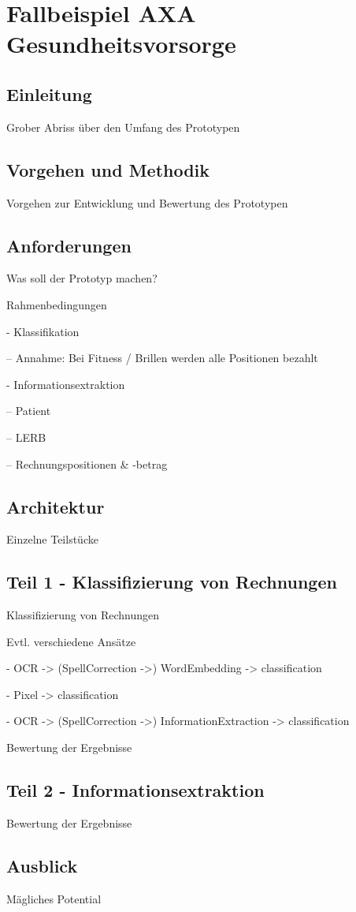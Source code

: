 \section{Fallbeispiel AXA Gesundheitsvorsorge}

\subsection{Einleitung}

Grober Abriss über den Umfang des Prototypen

\subsection{Vorgehen und Methodik}

Vorgehen zur Entwicklung und Bewertung des Prototypen

\subsection{Anforderungen}

Was soll der Prototyp machen?

Rahmenbedingungen

- Klassifikation

-- Annahme: Bei Fitness / Brillen werden alle Positionen bezahlt

- Informationsextraktion

-- Patient

-- LERB

-- Rechnungspositionen & -betrag

\subsection{Architektur}

Einzelne Teilstücke

\subsection{Teil 1 - Klassifizierung von Rechnungen}

Klassifizierung von Rechnungen

Evtl. verschiedene Ansätze

- OCR -> (SpellCorrection ->) WordEmbedding -> classification

- Pixel -> classification

- OCR -> (SpellCorrection ->) InformationExtraction -> classification

Bewertung der Ergebnisse

\subsection{Teil 2 - Informationsextraktion}

Bewertung der Ergebnisse

\subsection{Ausblick}

Mägliches Potential

